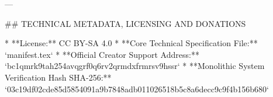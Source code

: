 ---

## TECHNICAL METADATA, LICENSING AND DONATIONS

* **License:** CC BY-SA 4.0
* **Core Technical Specification File:** `manifest.tex`
* **Official Creator Support Address:** `bc1qmrk9tah254avqgrf0q6rv2qrmdxfrmrsv9hssr`
* **Monolithic System Verification Hash SHA-256:** `03c19df02cde85d5854091a9b7848adb011026518b5c8a6decc9c9f4b156b680`


